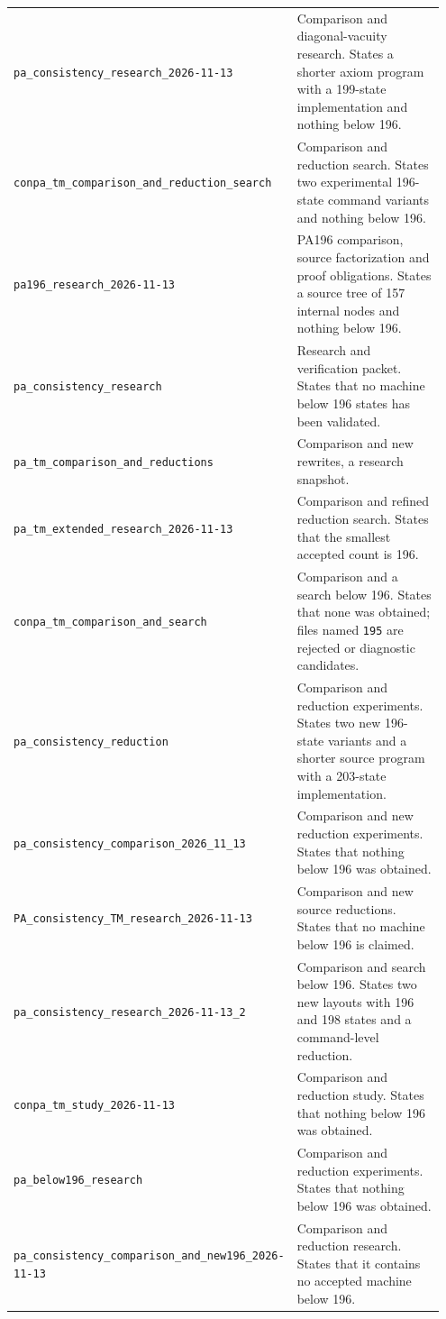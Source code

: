 \begin{longtable}{@{}>{\raggedright\arraybackslash}p{0.36\linewidth}>{\raggedright\arraybackslash}p{0.59\linewidth}@{}}
\nolinkurl{pa_consistency_research_2026-11-13} & Comparison and diagonal-vacuity research. States a shorter axiom program with a 199-state implementation and nothing below 196.\\[4pt]
\nolinkurl{conpa_tm_comparison_and_reduction_search} & Comparison and reduction search. States two experimental 196-state command variants and nothing below 196.\\[4pt]
\nolinkurl{pa196_research_2026-11-13} & PA196 comparison, source factorization and proof obligations. States a source tree of 157 internal nodes and nothing below 196.\\[4pt]
\nolinkurl{pa_consistency_research} & Research and verification packet. States that no machine below 196 states has been validated.\\[4pt]
\nolinkurl{pa_tm_comparison_and_reductions} & Comparison and new rewrites, a research snapshot.\\[4pt]
\nolinkurl{pa_tm_extended_research_2026-11-13} & Comparison and refined reduction search. States that the smallest accepted count is 196.\\[4pt]
\nolinkurl{conpa_tm_comparison_and_search} & Comparison and a search below 196. States that none was obtained; files named \nolinkurl{195} are rejected or diagnostic candidates.\\[4pt]
\nolinkurl{pa_consistency_reduction} & Comparison and reduction experiments. States two new 196-state variants and a shorter source program with a 203-state implementation.\\[4pt]
\nolinkurl{pa_consistency_comparison_2026_11_13} & Comparison and new reduction experiments. States that nothing below 196 was obtained.\\[4pt]
\nolinkurl{PA_consistency_TM_research_2026-11-13} & Comparison and new source reductions. States that no machine below 196 is claimed.\\[4pt]
\nolinkurl{pa_consistency_research_2026-11-13_2} & Comparison and search below 196. States two new layouts with 196 and 198 states and a command-level reduction.\\[4pt]
\nolinkurl{conpa_tm_study_2026-11-13} & Comparison and reduction study. States that nothing below 196 was obtained.\\[4pt]
\nolinkurl{pa_below196_research} & Comparison and reduction experiments. States that nothing below 196 was obtained.\\[4pt]
\nolinkurl{pa_consistency_comparison_and_new196_2026-11-13} & Comparison and reduction research. States that it contains no accepted machine below 196.\\[4pt]

\end{longtable}
